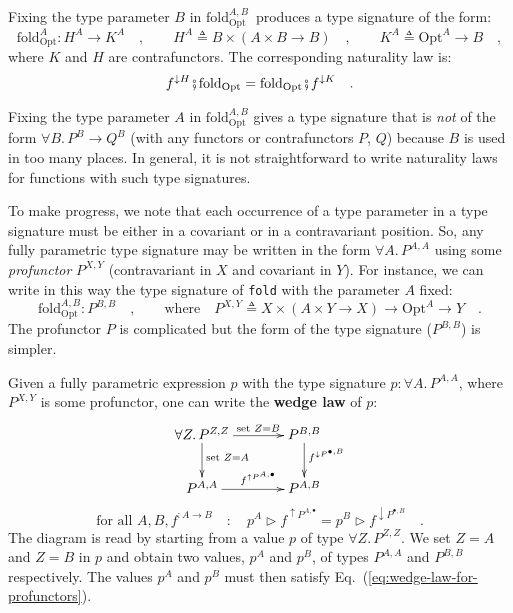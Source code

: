 Fixing the type parameter $B$ in $\text{fold}_{\text{Opt}}^{A,B}\,$
produces a type signature of the form:
\[
\text{fold}_{\text{Opt}}^{A}:H^{A}\rightarrow K^{A}\quad,\quad\quad H^{A}\triangleq B\times\left(A\times B\rightarrow B\right)\quad,\quad\quad K^{A}\triangleq\text{Opt}^{A}\rightarrow B\quad,
\]
where $K$ and $H$ are contrafunctors. The corresponding naturality
law is:
\[
f^{\downarrow H}\bef\text{fold}_{\text{Opt}}=\text{fold}_{\text{Opt}}\bef f^{\downarrow K}\quad.
\]

Fixing the type parameter $A$ in $\text{fold}_{\text{Opt}}^{A,B}$
gives a type signature that is \emph{not} of the form $\forall B.\,P^{B}\rightarrow Q^{B}$
(with any functors or contrafunctors $P$, $Q$) because $B$ is used
in too many places. In general, it is not straightforward to write
naturality laws for functions with such type signatures. 

To make progress, we note that each occurrence of a type parameter
in a type signature must be either in a covariant or in a contravariant
position. So, any fully parametric type signature may be written in
the form $\forall A.\,P^{A,A}$ using some \emph{profunctor}
$P^{X,Y}$ (contravariant in $X$ and covariant in $Y$). For instance,
we can write in this way the type signature of \lstinline!fold! with
the parameter $A$ fixed:
\[
\text{fold}_{\text{Opt}}^{A,B}:P^{B,B}\quad,\quad\quad\text{where}\quad P^{X,Y}\triangleq X\times(A\times Y\rightarrow X)\rightarrow\text{Opt}^{A}\rightarrow Y\quad.
\]
The profunctor $P$ is complicated but the form of the type signature
($P^{B,B}$) is simpler.

Given a fully parametric expression $p$ with the type signature $p:\forall A.\,P^{A,A}$,
where $P^{X,Y}$ is some profunctor, one can write the \textbf{wedge
law}
of $p$:
\[
\xymatrix{\xyScaleY{2.0pc}\xyScaleX{3.0pc}\forall Z.\,P^{Z,Z}\ar[d]\sp(0.4){\text{set }Z=A}\ar[r]\sp(0.55){\text{set }Z=B} & P^{B,B}\ar[d]\sp(0.37){f^{\downarrow P^{\bullet,B}}}\\
P^{A,A}\ar[r]\sp(0.55){f^{\uparrow P^{A,\bullet}}} & P^{A,B}
}
\]
\begin{equation}
\text{for all }A,B,f^{:A\rightarrow B}\quad:\quad p^{A}\triangleright f^{\uparrow P^{A,\bullet}}=p^{B}\triangleright f^{\downarrow P^{\bullet,B}}\quad.\label{eq:wedge-law-for-profunctors}
\end{equation}
The diagram is read by starting from a value $p$ of type $\forall Z.\,P^{Z,Z}$.
We set $Z=A$ and $Z=B$ in $p$ and obtain two values, $p^{A}$ and
$p^{B}$, of types $P^{A,A}$ and $P^{B,B}$ respectively. The values
$p^{A}$ and $p^{B}$ must then satisfy Eq.~(\ref{eq:wedge-law-for-profunctors}). 


